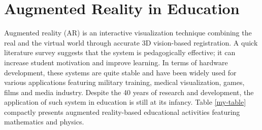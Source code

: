 \documentclass[conference]{IEEEtran}
\begin{document}
\section{Augmented Reality in Education}Augmented reality (AR) is an interactive visualization technique combining the 
real and the virtual world through accurate 3D vision-based registration. A quick literature survey suggests that the 
system is pedagogically effective; it can increase student motivation and improve learning. In terms of hardware 
development, these systems are quite stable and have been widely used for various applications featuring military 
training, medical visualization, games, films and media industry. Despite the 40 years of research and development, the 
application of such system in education is still at its infancy. Table \ref{my-table} compactly presents augmented 
reality-based educational activities featuring mathematics and physics.
\end{document}
